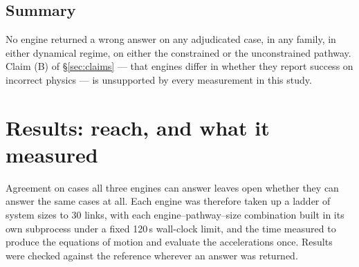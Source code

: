 \documentclass[review,12pt]{elsarticle}
\begin{document}
\subsection{Summary}
No engine returned a wrong answer on any adjudicated case, in any family, in
either dynamical regime, on either the constrained or the unconstrained pathway.
Claim (B) of \S\ref{sec:claims} --- that engines differ in whether they report
success on incorrect physics --- is unsupported by every measurement in this
study.

\section{Results: reach, and what it measured}\label{sec:reach}

Agreement on cases all three engines can answer leaves open whether they can
answer the same cases at all. Each engine was therefore taken up a ladder of
system sizes to 30 links, with each engine--pathway--size combination built in
its own subprocess under a fixed 120\,s wall-clock limit, and the time measured
to produce the equations of motion and evaluate the accelerations once. Results
were checked against the reference wherever an answer was returned.
\end{document}
